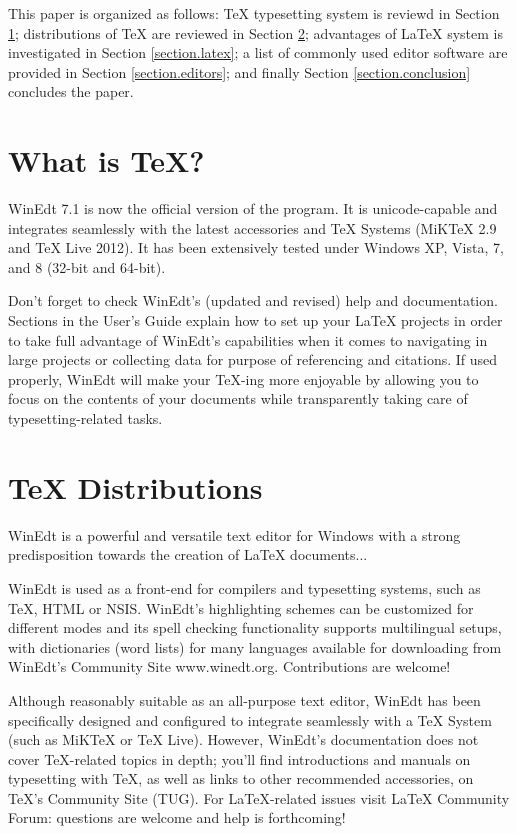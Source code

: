 \documentclass[11pt,a4paper,twocolumn]{article}
\begin{document}
	This paper is organized as follows: \TeX{} typesetting system is reviewd in Section \ref{section.tex}; distributions of \TeX{} are reviewed in Section \ref{section.dist}; advantages of \LaTeX{} system is investigated in Section \ref{section.latex}; a list of commonly used editor software are provided in Section \ref{section.editors}; and finally Section \ref{section.conclusion} concludes the paper.
	
	\section{What is \TeX{}?} \label{section.tex}
	
	WinEdt 7.1 is now the official version of the program. It is unicode-capable and integrates seamlessly with the latest accessories and TeX Systems (MiKTeX 2.9 and TeX Live 2012). It has been extensively tested under Windows XP, Vista, 7, and 8 (32-bit and 64-bit).
	
	Don't forget to check WinEdt's (updated and revised) help and documentation. Sections in the User's Guide explain how to set up your LaTeX projects in order to take full advantage of WinEdt's capabilities when it comes to navigating in large projects or collecting data for purpose of referencing and citations. If used properly, WinEdt will make your TeX-ing more enjoyable by allowing you to focus on the contents of your documents while transparently taking care of typesetting-related tasks.
	
	\section{\TeX{} Distributions} \label{section.dist}
	
	WinEdt is a powerful and versatile text editor for Windows with a strong predisposition towards the creation of LaTeX documents...
	
	WinEdt is used as a front-end for compilers and typesetting systems, such as TeX, HTML or NSIS. WinEdt's highlighting schemes can be customized for different modes and its spell checking functionality supports multilingual setups, with dictionaries (word lists) for many languages available for downloading from WinEdt's Community Site www.winedt.org. Contributions are welcome!
	
	Although reasonably suitable as an all-purpose text editor, WinEdt has been specifically designed and configured to integrate seamlessly with a TeX System (such as MiKTeX or TeX Live). However, WinEdt's documentation does not cover TeX-related topics in depth; you'll find introductions and manuals on typesetting with TeX, as well as links to other recommended accessories, on TeX's Community Site (TUG). For LaTeX-related issues visit LaTeX Community Forum: questions are welcome and help is forthcoming!
	
\end{document}
